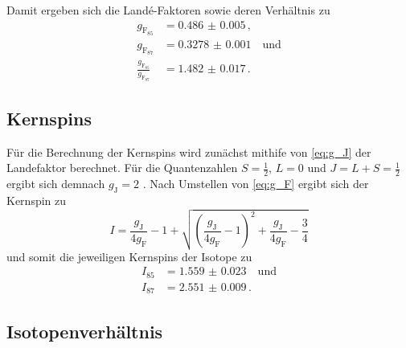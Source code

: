 Damit ergeben sich die Landé-Faktoren sowie deren Verhältnis zu
\begin{equation*}
    \begin{aligned}
        g_{\text{F}_{85}} &= \num{0.486(5)} \, , \\
        g_{\text{F}_{87}} &= \num{0.3278(10)} \quad \text{und} \\
        \frac{g_{\text{F}_{85}}}{g_{\text{F}_{87}}} &= \num{1.482(17)} \, .  
    \end{aligned}
\end{equation*}


\subsection{Kernspins}

Für die Berechnung der Kernspins wird zunächst mithife von \autoref{eq:g_J} der Landefaktor berechnet.
Für die Quantenzahlen $S=\frac{1}{2}$, $L=0$ und $J=L+S=\frac{1}{2}$ ergibt sich demnach $g_\text{J} = 2$ \cite{optical_pumping}.
Nach Umstellen von \autoref{eq:g_F} ergibt sich der Kernspin zu
\begin{equation}
    I=\frac{g_\text{J}}{4 g_\text{F}}-1+\sqrt{\left(\frac{g_\text{J}}{4 g_\text{F}}-1\right)^2+\frac{g_\text{J}}{4 g_\text{F}}-\frac{3}{4}}
\end{equation}
und somit die jeweiligen Kernspins der Isotope zu
\begin{align*}
    I_{85} &= \num{1.559(23)} \quad \text{und} \\
    I_{87} &= \num{2.551(9)} \, .
\end{align*}


\subsection{Isotopenverhältnis}

